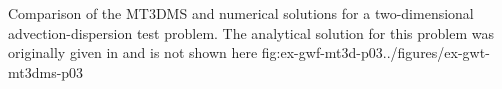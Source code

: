 
\begin{StandardFigure}
	{Comparison of the MT3DMS and \mf numerical solutions for a two-dimensional advection-dispersion test problem.  The analytical solution for this problem was originally given in \cite{wilson1978} and is not shown here}
	{fig:ex-gwf-mt3d-p03}{../figures/ex-gwt-mt3dms-p03}
\end{StandardFigure}